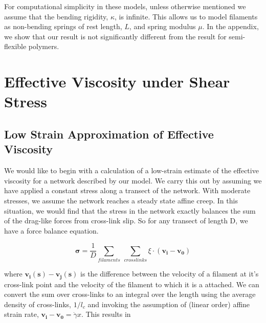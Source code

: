 \documentclass[pre,reprint]{revtex4-1}
\begin{document}
For computational simplicity in these models, unless otherwise mentioned we assume that the bending rigidity, $\kappa$, is infinite. This allows us to model filaments as non-bending springs of rest length, $L$, and spring modulus $\mu$.  In the appendix, we show that our result is not significantly different from the result for semi-flexible polymers.































\section{Effective Viscosity under Shear Stress}


\subsection{Low Strain Approximation of Effective Viscosity}
We would like to begin with a calculation of a low-strain estimate of the effective viscosity for a network described by our model.  We carry this out by assuming we have applied a constant stress along a transect of the network.  With moderate stresses, we assume the network reaches a steady state affine creep. In this situation, we would find that the stress in the network exactly balances the sum of the drag-like forces from cross-link slip.  So for any transect of length D, we have a force balance equation.

\begin{equation}
\mathbf{\sigma} = \frac{1}{D}\sum_{filaments}\: \sum_{crosslinks}\xi \cdot (\mathbf{v_i}-\mathbf{v_0})
\end{equation}

where $\mathbf{v_i(s)}-\mathbf{v_j(s)}$ is the difference between the velocity of a filament at it's cross-link point and the velocity of the filament to which it is a attached. We can convert the sum over cross-links to an integral over the length using the average density of cross-links, $1/l_c$ and invoking the assumption of (linear order) affine strain rate, $\mathbf{v_i}-\mathbf{v_0}=\dot \gamma x$. This results in
\end{document}
